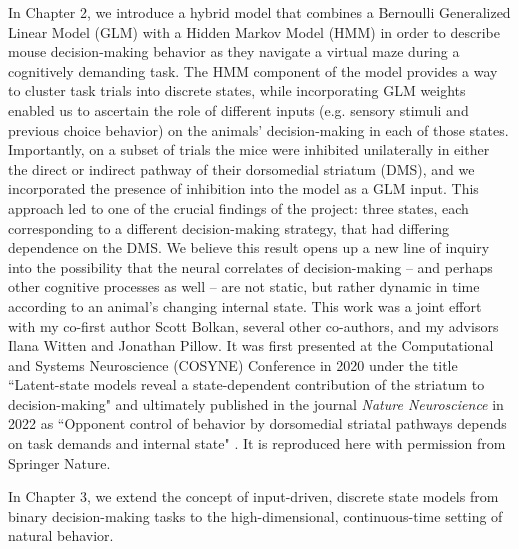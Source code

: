 In Chapter 2, we introduce a hybrid model that combines a Bernoulli Generalized Linear Model (GLM) with a Hidden Markov Model (HMM) in order to describe mouse decision-making behavior as they navigate a virtual maze during a cognitively demanding task. The HMM component of the model provides a way to cluster task trials into discrete states, while incorporating GLM weights enabled us to ascertain the role of different inputs (e.g. sensory stimuli and previous choice behavior) on the animals' decision-making in each of those states. Importantly, on a subset of trials the mice were inhibited unilaterally in either the direct or indirect pathway of their dorsomedial striatum (DMS), and we incorporated the presence of inhibition into the model as a GLM input. This approach led to one of the crucial findings of the project: three states, each corresponding to a different decision-making strategy, that had differing dependence on the DMS. We believe this result opens up a new line of inquiry into the possibility that the neural correlates of decision-making -- and perhaps other cognitive processes as well -- are not static, but rather dynamic in time according to an animal's changing internal state. This work was a joint effort with my co-first author Scott Bolkan, several other co-authors, and my advisors Ilana Witten and Jonathan Pillow. It was first presented at the Computational and Systems Neuroscience (COSYNE) Conference in 2020 under the title ``Latent-state models reveal a state-dependent contribution of the striatum to decision-making" and ultimately published in the journal \textit{Nature Neuroscience} in 2022 as ``Opponent control of behavior by dorsomedial striatal pathways depends on task demands and internal state" \cite{bolkan_opponent_2022}. It is reproduced here with permission from Springer Nature. 

In Chapter 3, we extend the concept of input-driven, discrete state models from binary decision-making tasks to the high-dimensional, continuous-time setting of natural behavior. 